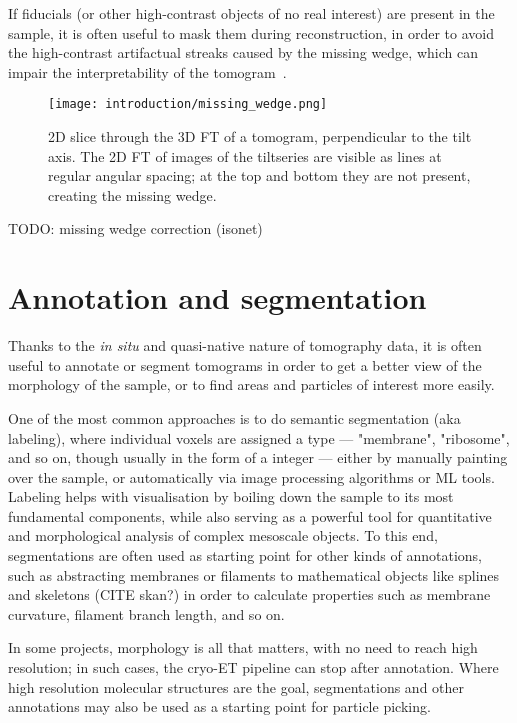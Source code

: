 If fiducials (or other high-contrast objects of no real interest) are present in the sample, it is often useful to mask them during reconstruction, in order to avoid the high-contrast artifactual streaks caused by the missing wedge, which can impair the interpretability of the tomogram~\cite{tegunovRealtimeCryoelectronMicroscopy2019,burtTeamtomoFidder2024}.

\begin{figure}[ht]
    \centering
    \texttt{[image: introduction/missing\_wedge.png]}
    \caption[Missing wedge]{2D slice through the 3D FT of a tomogram, perpendicular to the tilt axis. The 2D FT of images of the tiltseries are visible as lines at regular angular spacing; at the top and bottom they are not present, creating the missing wedge.}
    \label{fig:et_missing_wedge}
\end{figure}

TODO: missing wedge correction (isonet)

\section{Annotation and segmentation}\label{et_annotation_segmentation}
Thanks to the \textit{in situ} and quasi-native nature of tomography data, it is often useful to annotate or segment tomograms in order to get a better view of the morphology of the sample, or to find areas and particles of interest more easily.

One of the most common approaches is to do semantic segmentation (aka labeling), where individual voxels are assigned a type --- "membrane", "ribosome", and so on, though usually in the form of a integer --- either by manually painting over the sample, or automatically via image processing algorithms or ML tools.
Labeling helps with visualisation by boiling down the sample to its most fundamental components, while also serving as a powerful tool for quantitative and morphological analysis of complex mesoscale objects.
To this end, segmentations are often used as starting point for other kinds of annotations, such as abstracting membranes or filaments to mathematical objects like splines and skeletons (CITE skan?) in order to calculate properties such as membrane curvature, filament branch length, and so on.

In some projects, morphology is all that matters, with no need to reach high resolution; in such cases, the cryo-ET pipeline can stop after annotation.
Where high resolution molecular structures are the goal, segmentations and other annotations may also be used as a starting point for particle picking.

